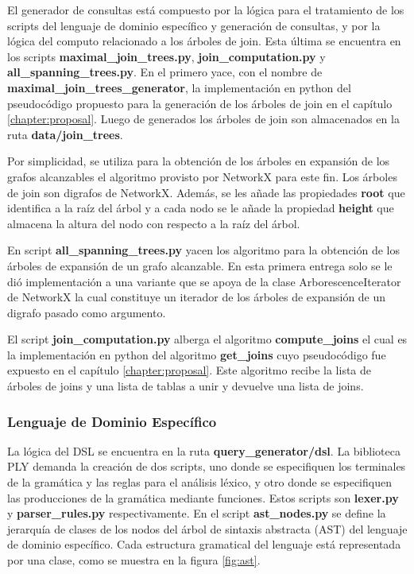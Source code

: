 El generador de consultas est\'a compuesto por la lógica para el tratamiento de los scripts del lenguaje de 
dominio específico y generación de consultas, y por la lógica del computo relacionado a los \'arboles de join. 
Esta \'ultima se encuentra en los scripts \textbf{maximal\_join\_trees.py}, \textbf{join\_computation.py} y 
\textbf{all\_spanning\_trees.py}. En el primero yace, con el nombre de \textbf{maximal\_join\_trees\_generator}, 
la implementación en python del pseudoc\'odigo propuesto para la generación de los \'arboles de join en el 
capítulo \ref{chapter:proposal}. Luego de generados los árboles de join son almacenados en la ruta 
\textbf{data/join\_trees}.

Por simplicidad, se utiliza para la obtención de los \'arboles en expansión de los grafos alcanzables el algoritmo 
provisto por NetworkX para este fin. Los \'arboles de join son digrafos de NetworkX. Además, se les añade las propiedades 
\textbf{root} que identifica a la raíz del \'arbol y a cada nodo se le añade la propiedad \textbf{height} que almacena 
la altura del nodo con respecto a la raíz del \'arbol.

En script \textbf{all\_spanning\_trees.py} yacen los algoritmo para la obtención de los \'arboles de expansión 
de un grafo alcanzable. En esta primera entrega solo se le di\'o implementación a una variante que se apoya de la 
clase ArborescenceIterator de NetworkX la cual constituye un iterador de los \'arboles de expansión de un digrafo 
pasado como argumento.

El script \textbf{join\_computation.py} alberga el algoritmo \textbf{compute\_joins} el cual es la implementación 
en python del algoritmo \textbf{get\_joins} cuyo pseudoc\'odigo fue expuesto en el capítulo \ref{chapter:proposal}. 
Este algoritmo recibe la lista de \'arboles de joins y una lista de tablas a unir y devuelve una lista de joins.

\subsubsection{Lenguaje de Dominio Espec\'ifico}

La lógica del DSL se encuentra en la ruta \textbf{query\_generator/dsl}. La biblioteca 
PLY demanda la creación de dos scripts, uno donde se especifiquen los terminales de la gramática y las reglas 
para el análisis léxico, y otro donde se especifiquen las producciones de la gramática mediante funciones. Estos 
scripts son \textbf{lexer.py} y \textbf{parser\_rules.py} respectivamente. En el script \textbf{ast\_nodes.py} se define  
la jerarquía de clases de los nodos del \'arbol de sintaxis abstracta (AST) del lenguaje de dominio específico. Cada 
estructura gramatical del lenguaje est\'a representada por una clase, como se muestra en la figura \ref{fig:ast}.

